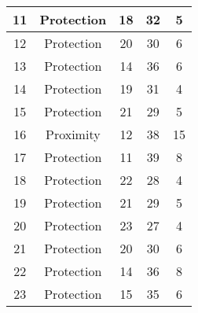 \documentclass[results.tex]{subfiles}
\begin{document}
\begin{center}
\begin{tabular}{| c || c | c | c | c |}
            \hline
            11                      & Protection                   & 18                     & 32                      & 5                    \\
            \hline
            12                      & Protection                   & 20                     & 30                      & 6                    \\
            \hline
            13                      & Protection                   & 14                     & 36                      & 6                    \\
            \hline
            14                      & Protection                   & 19                     & 31                      & 4                    \\
            \hline
            15                      & Protection                   & 21                     & 29                      & 5                    \\
            \hline
            16                      & Proximity                    & 12                     & 38                      & 15                   \\
            \hline
            17                      & Protection                   & 11                     & 39                      & 8                    \\
            \hline
            18                      & Protection                   & 22                     & 28                      & 4                    \\
            \hline
            19                      & Protection                   & 21                     & 29                      & 5                    \\
            \hline
            20                      & Protection                   & 23                     & 27                      & 4                    \\
            \hline
            21                      & Protection                   & 20                     & 30                      & 6                    \\
            \hline
            22                      & Protection                   & 14                     & 36                      & 8                    \\
            \hline
            23                      & Protection                   & 15                     & 35                      & 6                    \\

\end{tabular}
\end{center}
\end{document}
